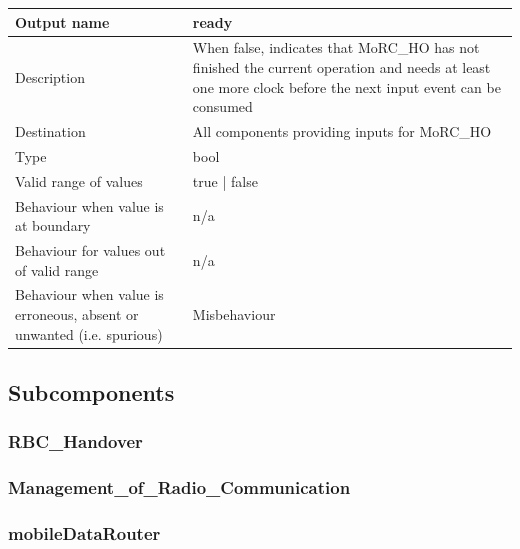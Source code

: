 \begin{longtable}{p{}p{}}
	\toprule
	Output name				& ready \\
	\midrule
	Description				& When false, indicates that MoRC\_HO has not finished the current operation and needs at least one more clock before the next input event can be consumed \\
	\midrule
	Destination				& All components providing inputs for MoRC\_HO \\ 
	\midrule
	Type					& bool \\
	\midrule
	Valid range of values	& true | false \\
	\midrule
	Behaviour when value is at boundary	& n/a \\
	\midrule
	Behaviour for values out of valid range	& n/a \\
	\midrule
	Behaviour when value is erroneous, absent or unwanted (i.e. spurious) & Misbehaviour \\
	\bottomrule
\end{longtable}



\subsection{Subcomponents}\label{s:manage_radio_communication_subcomponents}

\subsubsection{RBC\_Handover}


\subsubsection{Management\_of\_Radio\_Communication}


\subsubsection{mobileDataRouter}

